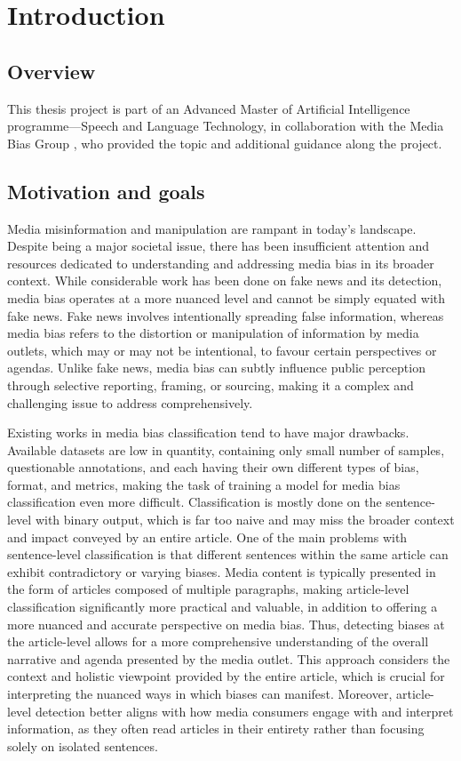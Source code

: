 \chapter{Introduction}
\label{cha:1}

\section{Overview}

This thesis project is part of an Advanced Master of Artificial Intelligence programme—Speech and Language Technology, in collaboration with the Media Bias Group \cite{media-bias-group}, who provided the topic and additional guidance along the project.

\section{Motivation and goals}

Media misinformation and manipulation are rampant in today's landscape. Despite being a major societal issue, there has been insufficient attention and resources dedicated to understanding and addressing media bias in its broader context. While considerable work has been done on fake news and its detection, media bias operates at a more nuanced level and cannot be simply equated with fake news. Fake news involves intentionally spreading false information, whereas media bias refers to the distortion or manipulation of information by media outlets, which may or may not be intentional, to favour certain perspectives or agendas. Unlike fake news, media bias can subtly influence public perception through selective reporting, framing, or sourcing, making it a complex and challenging issue to address comprehensively.

Existing works in media bias classification tend to have major drawbacks. Available datasets are low in quantity, containing only small number of samples, questionable annotations, and each having their own different types of bias, format, and metrics, making the task of training a model for media bias classification even more difficult. Classification is mostly done on the sentence-level with binary output, which is far too naive and may miss the broader context and impact conveyed by an entire article. One of the main problems with sentence-level classification is that different sentences within the same article can exhibit contradictory or varying biases. Media content is typically presented in the form of articles composed of multiple paragraphs, making article-level classification significantly more practical and valuable, in addition to offering a more nuanced and accurate perspective on media bias. Thus, detecting biases at the article-level allows for a more comprehensive understanding of the overall narrative and agenda presented by the media outlet. This approach considers the context and holistic viewpoint provided by the entire article, which is crucial for interpreting the nuanced ways in which biases can manifest. Moreover, article-level detection better aligns with how media consumers engage with and interpret information, as they often read articles in their entirety rather than focusing solely on isolated sentences.


